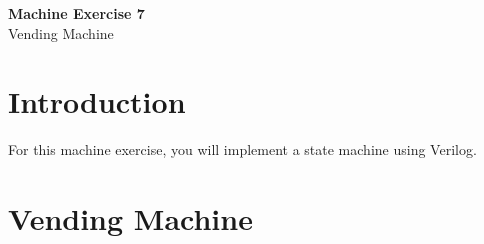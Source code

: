 \clearpage
\setcounter{page}{1}

\begin{center}
    \vspace*{3em}
    {\LARGE \textbf{Machine Exercise 7}}\\
    {\vspace{1.5em}}
    {\large Vending Machine}\\
\end{center}

\section{Introduction}
    For this machine exercise, you will implement a state machine using Verilog.
		
	\section{Vending Machine}
